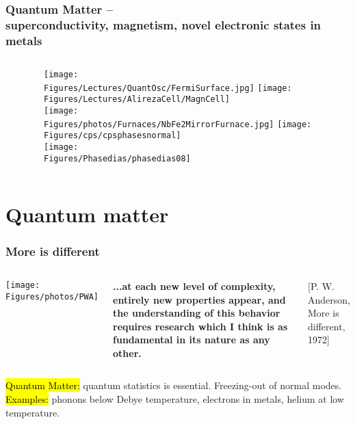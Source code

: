 \begin{frame}[label=MethodsIntro]
  \frametitle{Quantum Matter -- \\ superconductivity, magnetism, novel electronic states in metals}

\begin{columns}[c]
\centerline{~}
\tableofcontents

\centerline{~}
\texttt{[image: \\Figures/Lectures/QuantOsc/FermiSurface.jpg]}
\texttt{[image: \\Figures/Lectures/AlirezaCell/MagnCell]}\\
\texttt{[image: \\Figures/photos/Furnaces/NbFe2MirrorFurnace.jpg]}
\texttt{[image: \\Figures/cps/cpsphasesnormal]} \\

\texttt{[image: \\Figures/Phasedias/phasedias08]}
\end{columns}



\end{frame}

\section{Quantum matter}
\begin{frame}[label=Moredifferent]
\frametitle{More is different}

\begin{columns}[c]
\centerline{\texttt{[image: \\Figures/photos/PWA]}}

{\bf ...at each new level of complexity, entirely new properties
  appear, and the understanding of this behavior requires research
  which I think is as fundamental in its nature as any other.} \\

\centerline{\scriptsize [P. W. Anderson, More is different, 1972]}
\end{columns}
\vspace{2em}
\pause
\hl{Quantum Matter:}  quantum statistics is essential. Freezing-out of
normal modes. \\

\hl{Examples:} phonons below Debye temperature, electrons in metals,
helium at low temperature.
\end{frame}



